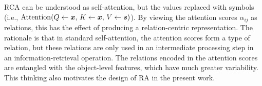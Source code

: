 
RCA can be understood as self-attention, but the values replaced with symbols (i.e., $\mathrm{Attention}(Q \gets \bm{x},\, K \gets \bm{x},\, V \gets \bm{s})$). By viewing the attention scores $\alpha_{ij}$ as relations, this has the effect of producing a relation-centric representation. The rationale is that in standard self-attention, the attention scores form a type of relation, but these relations are only used in an intermediate processing step in an information-retrieval operation. The relations encoded in the attention scores are entangled with the object-level features, which have much greater variability. This thinking also motivates the design of RA in the present work.

